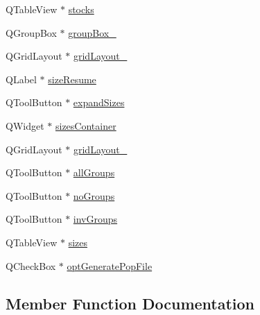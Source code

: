 \begin{DoxyCompactItemize}
\item 
Q\+Table\+View $\ast$ \mbox{\hyperlink{class_ui___merge_population_plugin_component_aa3de2d854df8806beae4cfce4d122ad6}{stocks}}
\item 
Q\+Group\+Box $\ast$ \mbox{\hyperlink{class_ui___merge_population_plugin_component_a71591c60468efea9a51aaf299c71ca3d}{group\+Box\+\_}}
\item 
Q\+Grid\+Layout $\ast$ \mbox{\hyperlink{class_ui___merge_population_plugin_component_a59af880aa749e371d5c3a8f89c750a7a}{grid\+Layout\+\_}}
\item 
Q\+Label $\ast$ \mbox{\hyperlink{class_ui___merge_population_plugin_component_a1abcd9c55ebf2a3293b174133066a557}{size\+Resume}}
\item 
Q\+Tool\+Button $\ast$ \mbox{\hyperlink{class_ui___merge_population_plugin_component_ac3260769582c201980daf6e80ecf485f}{expand\+Sizes}}
\item 
Q\+Widget $\ast$ \mbox{\hyperlink{class_ui___merge_population_plugin_component_ab4288a9f42aabedfb4926a086e8bc4a5}{sizes\+Container}}
\item 
Q\+Grid\+Layout $\ast$ \mbox{\hyperlink{class_ui___merge_population_plugin_component_ac72b33e97d7c748586d0914bf659dfbd}{grid\+Layout\+\_}}
\item 
Q\+Tool\+Button $\ast$ \mbox{\hyperlink{class_ui___merge_population_plugin_component_a01428cd132c2e7037e9074e06f2bf84f}{all\+Groups}}
\item 
Q\+Tool\+Button $\ast$ \mbox{\hyperlink{class_ui___merge_population_plugin_component_ad8adce3f46563c812efed55e75ce334e}{no\+Groups}}
\item 
Q\+Tool\+Button $\ast$ \mbox{\hyperlink{class_ui___merge_population_plugin_component_a21bad0eb7fd167ebc7eed9b075b7a0bf}{inv\+Groups}}
\item 
Q\+Table\+View $\ast$ \mbox{\hyperlink{class_ui___merge_population_plugin_component_ac5bb7409a211dfeab4266e2a4bfcefca}{sizes}}
\item 
Q\+Check\+Box $\ast$ \mbox{\hyperlink{class_ui___merge_population_plugin_component_aa87a1df4854d9fd421c9744ca1744cd2}{opt\+Generate\+Pop\+File}}
\end{DoxyCompactItemize}


\subsection{Member Function Documentation}
\mbox{\label{class_ui___merge_population_plugin_component_a839539fbbb0beaf7886ad7d21e5a0880}} 
